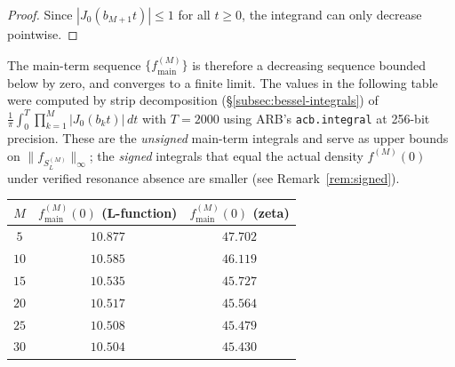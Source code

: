 \documentclass[12pt,reqno]{amsart}
\theoremstyle{plain}
\theoremstyle{definition}
\theoremstyle{remark}
\begin{document}
\begin{proof}
Since $|J_0(b_{M+1} t)| \leq 1$ for all $t \geq 0$, the integrand can only decrease pointwise.
\end{proof}

The main-term sequence $\{f_{\mathrm{main}}^{(M)}\}$ is therefore a decreasing sequence bounded below by zero, and converges to a finite limit.  The values in the following table were computed by strip decomposition (\S\ref{subsec:bessel-integrals}) of $\frac{1}{\pi}\int_0^T \prod_{k=1}^M |J_0(b_k t)|\, dt$ with $T = 2000$ using ARB's \texttt{acb.integral} at 256-bit precision.  These are the \emph{unsigned} main-term integrals and serve as upper bounds on $\|f_{S_L^{(M)}}\|_\infty$; the \emph{signed} integrals that equal the actual density $f^{(M)}(0)$ under verified resonance absence are smaller (see Remark~\ref{rem:signed}).

\begin{center}
\renewcommand{\arraystretch}{1.1}
\begin{tabular}{ccc}
\toprule
$M$ & $f_{\mathrm{main}}^{(M)}(0)$ (L-function) & $f_{\mathrm{main}}^{(M)}(0)$ (zeta) \\
\midrule
$5$ & $10.877$ & $47.702$ \\
$10$ & $10.585$ & $46.119$ \\
$15$ & $10.535$ & $45.727$ \\
$20$ & $10.517$ & $45.564$ \\
$25$ & $10.508$ & $45.479$ \\
$30$ & $10.504$ & $45.430$ \\
\bottomrule
\end{tabular}
\end{center}
\end{document}
